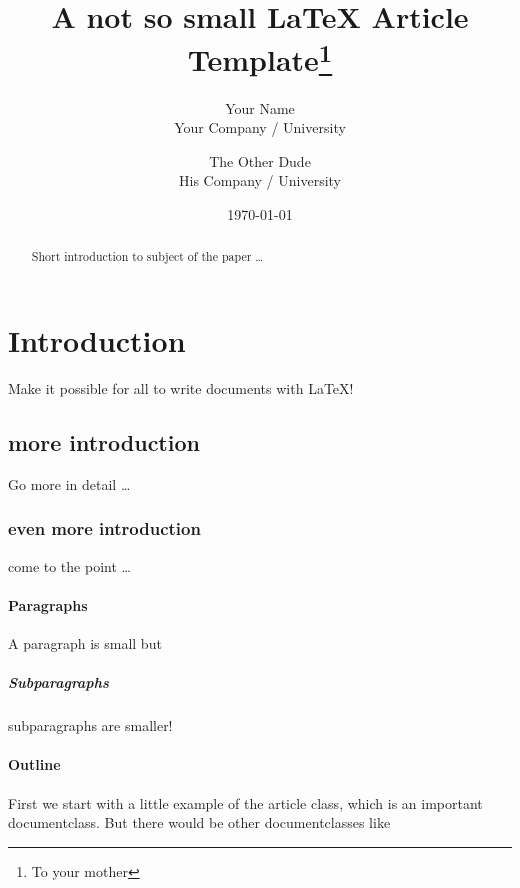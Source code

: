\documentclass[12pt, a4paper, twoside, titlepage]{article}
\title{A not so small \LaTeX{} Article Template\thanks{To your mother}}
\author{
 	Your Name  \\
 	Your Company / University  \\
 	\and 
 	The Other Dude \\
 	His Company / University \\
 }
\date{\today}
\begin{document}
\maketitle

 \begin{abstract}
 Short introduction to subject of the paper \ldots 
 \end{abstract}

\tableofcontents %

\newpage

\section{Introduction}
Make it possible for all to write documents with \LaTeX{}!

\subsection{more introduction}
Go more in detail \ldots

\subsubsection{even more introduction}
come to the point \ldots

\paragraph{Paragraphs}
A paragraph is small but 

\subparagraph{Subparagraphs}
subparagraphs are smaller! 

\paragraph{Outline}
First we start with a little example of the article class, which is an 
important documentclass. But there would be other documentclasses like 

\end{document}
